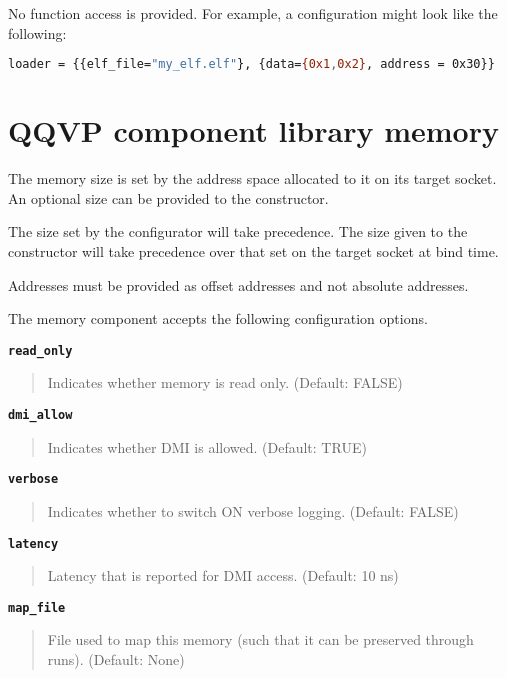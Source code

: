 No function access is provided. For example, a configuration might look like the following:

\small
\begin{lstlisting}[language=bash]
    loader = {{elf_file="my_elf.elf"}, {data={0x1,0x2}, address = 0x30}}
\end{lstlisting}
\normalsize


\clearpage
\section{QQVP component library memory}

The memory size is set by the address space allocated to it on its target socket. An optional size can be provided to the constructor.

The size set by the configurator will take precedence. The size given to the constructor will take precedence over that set on the target socket at bind time.

\note Addresses must be provided as offset addresses and not absolute addresses.

The memory component accepts the following configuration options.

{\textbf {\footnotesize{\lstinline!read_only!}}}
\vspace{-2pt}
\begin{quote}
Indicates whether memory is read only. (Default: FALSE)
\end{quote}


{\textbf {\footnotesize{\lstinline!dmi_allow!}}}
\vspace{-2pt}
\begin{quote}
Indicates whether DMI is allowed. (Default: TRUE)
\end{quote}


{\textbf {\footnotesize{\lstinline!verbose!}}}
\vspace{-2pt}
\begin{quote}
Indicates whether to switch ON verbose logging. (Default: FALSE)
\end{quote}


{\textbf {\footnotesize{\lstinline!latency!}}}
\vspace{-2pt}
\begin{quote}
Latency that is reported for DMI access. (Default: 10 ns)
\end{quote}


{\textbf {\footnotesize{\lstinline!map_file!}}}
\vspace{-2pt}
\begin{quote}
File used to map this memory (such that it can be preserved through runs). (Default: None)
\end{quote}


